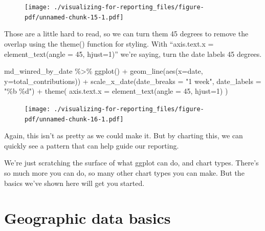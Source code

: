 \documentclass[
  letterpaper,
  DIV=11,
  numbers=noendperiod]{scrreprt}
\newenvironment{Shaded}{\begin{snugshade}}{\end{snugshade}}
\newcommand{\AttributeTok}[1]{\textcolor[rgb]{0.40,0.45,0.13}{#1}}
\newcommand{\DecValTok}[1]{\textcolor[rgb]{0.68,0.00,0.00}{#1}}
\newcommand{\FunctionTok}[1]{\textcolor[rgb]{0.28,0.35,0.67}{#1}}
\newcommand{\NormalTok}[1]{\textcolor[rgb]{0.00,0.23,0.31}{#1}}
\newcommand{\SpecialCharTok}[1]{\textcolor[rgb]{0.37,0.37,0.37}{#1}}
\newcommand{\StringTok}[1]{\textcolor[rgb]{0.13,0.47,0.30}{#1}}
\begin{document}
\begin{figure}[H]

{\centering \texttt{[image: ./visualizing-for-reporting\_files/figure-pdf/unnamed-chunk-15-1.pdf]}

}

\end{figure}

Those are a little hard to read, so we can turn them 45 degrees to
remove the overlap using the theme() function for styling. With
``axis.text.x = element\_text(angle = 45, hjust=1)'' we're saying, turn
the date labels 45 degrees.

\begin{Shaded}
\begin{Highlighting}[]
\NormalTok{md\_winred\_by\_date }\SpecialCharTok{\%\textgreater{}\%}
  \FunctionTok{ggplot}\NormalTok{() }\SpecialCharTok{+} 
  \FunctionTok{geom\_line}\NormalTok{(}\FunctionTok{aes}\NormalTok{(}\AttributeTok{x=}\NormalTok{date, }\AttributeTok{y=}\NormalTok{total\_contributions)) }\SpecialCharTok{+} 
  \FunctionTok{scale\_x\_date}\NormalTok{(}\AttributeTok{date\_breaks =} \StringTok{"1 week"}\NormalTok{, }\AttributeTok{date\_labels =} \StringTok{"\%b \%d"}\NormalTok{) }\SpecialCharTok{+}
  \FunctionTok{theme}\NormalTok{(}
    \AttributeTok{axis.text.x =} \FunctionTok{element\_text}\NormalTok{(}\AttributeTok{angle =} \DecValTok{45}\NormalTok{,  }\AttributeTok{hjust=}\DecValTok{1}\NormalTok{)}
\NormalTok{  )}
\end{Highlighting}
\end{Shaded}

\begin{figure}[H]

{\centering \texttt{[image: ./visualizing-for-reporting\_files/figure-pdf/unnamed-chunk-16-1.pdf]}

}

\end{figure}

Again, this isn't as pretty as we could make it. But by charting this,
we can quickly see a pattern that can help guide our reporting.

We're just scratching the surface of what ggplot can do, and chart
types. There's so much more you can do, so many other chart types you
can make. But the basics we've shown here will get you started.


\hypertarget{geographic-data-basics}{%
\chapter{Geographic data basics}\label{geographic-data-basics}}
\end{document}
